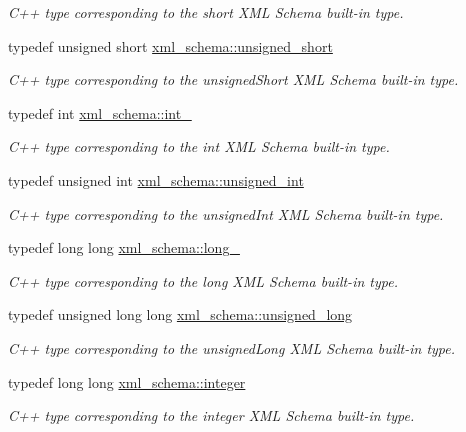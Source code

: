 \begin{DoxyCompactItemize}
\begin{DoxyCompactList}\small\item\em C++ type corresponding to the short X\-M\-L Schema built-\/in type. \end{DoxyCompactList}\item 
typedef unsigned short \hyperlink{namespacexml__schema_a7fc7b4a846c512c370346e15dfdcecaa}{xml\-\_\-schema\-::unsigned\-\_\-short}
\begin{DoxyCompactList}\small\item\em C++ type corresponding to the unsigned\-Short X\-M\-L Schema built-\/in type. \end{DoxyCompactList}\item 
typedef int \hyperlink{namespacexml__schema_acfa24ac68e1a188e7f44c36f7a158bf4}{xml\-\_\-schema\-::int\-\_\-}
\begin{DoxyCompactList}\small\item\em C++ type corresponding to the int X\-M\-L Schema built-\/in type. \end{DoxyCompactList}\item 
typedef unsigned int \hyperlink{namespacexml__schema_a85ca3205d8af287e149aac54535f57e7}{xml\-\_\-schema\-::unsigned\-\_\-int}
\begin{DoxyCompactList}\small\item\em C++ type corresponding to the unsigned\-Int X\-M\-L Schema built-\/in type. \end{DoxyCompactList}\item 
typedef long long \hyperlink{namespacexml__schema_a1d78aacee49e26cb7a69d5aa97df1268}{xml\-\_\-schema\-::long\-\_\-}
\begin{DoxyCompactList}\small\item\em C++ type corresponding to the long X\-M\-L Schema built-\/in type. \end{DoxyCompactList}\item 
typedef unsigned long long \hyperlink{namespacexml__schema_a4413fbcf4c65ffc7aaafe465d72fcb33}{xml\-\_\-schema\-::unsigned\-\_\-long}
\begin{DoxyCompactList}\small\item\em C++ type corresponding to the unsigned\-Long X\-M\-L Schema built-\/in type. \end{DoxyCompactList}\item 
typedef long long \hyperlink{namespacexml__schema_aaaea7c8ce4dfbe26cc52c91c29c97b7c}{xml\-\_\-schema\-::integer}
\begin{DoxyCompactList}\small\item\em C++ type corresponding to the integer X\-M\-L Schema built-\/in type. \end{DoxyCompactList}\item 

\end{DoxyCompactItemize}
